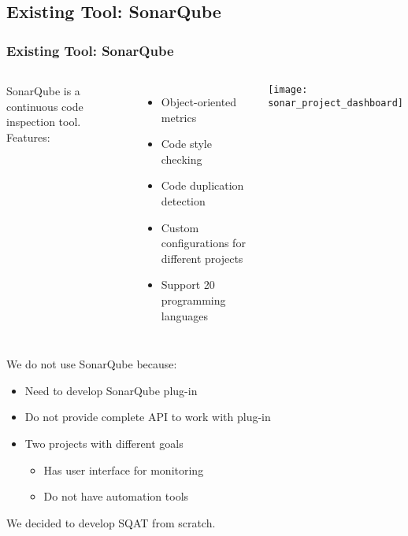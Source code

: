 \subsection{Existing Tool: SonarQube}
\begin{frame}[allowframebreaks]
\label{subsection:sonar_qube}
\frametitle{Existing Tool: SonarQube}

\begin{columns}
SonarQube is a continuous code inspection tool. Features:
\begin{itemize}
  \item Object-oriented metrics
  \item Code style checking
  \item Code duplication detection
  \item Custom configurations for different projects
  \item Support 20 programming languages
\end{itemize}
\texttt{[image: sonar\_project\_dashboard]}
\end{columns}

\hyperlink{appendix:sonar_qube}{}

\framebreak

We do not use SonarQube because:
\begin{itemize}
  \item Need to develop SonarQube plug-in
  \item Do not provide complete API to work with plug-in
    \item Two projects with different goals
  \begin{itemize}
    \item Has user interface for monitoring
    \item Do not have automation tools
  \end{itemize}
\end{itemize}

We decided to develop SQAT from scratch.

\end{frame}